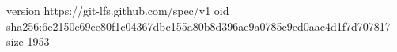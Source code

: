 version https://git-lfs.github.com/spec/v1
oid sha256:6c2150e69ee80f1c04367dbc155a80b8d396ae9a0785c9ed0aac4d1f7d707817
size 1953
